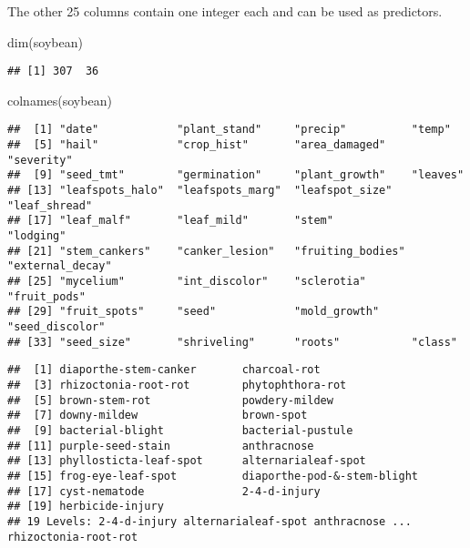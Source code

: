 \documentclass[
]{article}
\newenvironment{Shaded}{\begin{snugshade}}{\end{snugshade}}
\newcommand{\FunctionTok}[1]{\textcolor[rgb]{0.00,0.00,0.00}{#1}}
\newcommand{\NormalTok}[1]{#1}
\newcommand{\SpecialCharTok}[1]{\textcolor[rgb]{0.00,0.00,0.00}{#1}}
\begin{document}
The other 25 columns contain one integer each and can be used as
predictors.

\begin{Shaded}
\begin{Highlighting}[]
\FunctionTok{dim}\NormalTok{(soybean)}
\end{Highlighting}
\end{Shaded}

\begin{verbatim}
## [1] 307  36
\end{verbatim}

\begin{Shaded}
\begin{Highlighting}[]
\FunctionTok{colnames}\NormalTok{(soybean)}
\end{Highlighting}
\end{Shaded}

\begin{verbatim}
##  [1] "date"            "plant_stand"     "precip"          "temp"           
##  [5] "hail"            "crop_hist"       "area_damaged"    "severity"       
##  [9] "seed_tmt"        "germination"     "plant_growth"    "leaves"         
## [13] "leafspots_halo"  "leafspots_marg"  "leafspot_size"   "leaf_shread"    
## [17] "leaf_malf"       "leaf_mild"       "stem"            "lodging"        
## [21] "stem_cankers"    "canker_lesion"   "fruiting_bodies" "external_decay" 
## [25] "mycelium"        "int_discolor"    "sclerotia"       "fruit_pods"     
## [29] "fruit_spots"     "seed"            "mold_growth"     "seed_discolor"  
## [33] "seed_size"       "shriveling"      "roots"           "class"
\end{verbatim}

\begin{Shaded}
\end{Shaded}

\begin{verbatim}
##  [1] diaporthe-stem-canker       charcoal-rot               
##  [3] rhizoctonia-root-rot        phytophthora-rot           
##  [5] brown-stem-rot              powdery-mildew             
##  [7] downy-mildew                brown-spot                 
##  [9] bacterial-blight            bacterial-pustule          
## [11] purple-seed-stain           anthracnose                
## [13] phyllosticta-leaf-spot      alternarialeaf-spot        
## [15] frog-eye-leaf-spot          diaporthe-pod-&-stem-blight
## [17] cyst-nematode               2-4-d-injury               
## [19] herbicide-injury           
## 19 Levels: 2-4-d-injury alternarialeaf-spot anthracnose ... rhizoctonia-root-rot
\end{verbatim}
\end{document}
